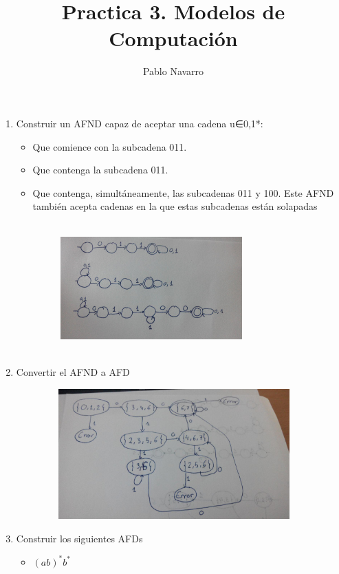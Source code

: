 \documentclass{article}
\begin{document}
\title{Practica 3. Modelos de Computación}
\author{Pablo Navarro}
\maketitle
\begin{enumerate}
  \item Construir un AFND capaz de aceptar una cadena u∈{0,1}*:
  \begin{itemize}
    \item Que comience con la subcadena 011.
    \item Que contenga la subcadena 011.
    \item Que contenga, simultáneamente, las subcadenas 011 y 100. Este AFND
          también acepta cadenas en la que estas subcadenas están solapadas
    \begin{figure}[H]
      \centering
      \includegraphics[width=7cm, height=5cm]{imagenes/ejercicio1.jpg}
    \end{figure}
  \end{itemize}
  \item Convertir el AFND a AFD
    \begin{figure}[H]
      \centering
      \includegraphics[width=10cm, height=5cm]{imagenes/ejercicio2.jpg}
    \end{figure}
  \item Construir los siguientes AFDs
  \begin{itemize}
    \item $(ab)^*b^*$
    \begin{figure}[H]

\end{figure}
\end{itemize}
\end{enumerate}
\end{document}
